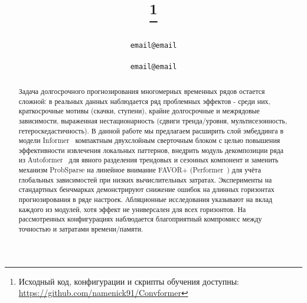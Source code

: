 \pagestyle{fancy}
\thispagestyle{empty}
\rhead{ \textit{ }} 


\title{
    \textbf{\paperName}
    \thanks{Исходный код, конфигурации и скрипты обучения доступны: \href{https://github.com/namenick91/Convformer}{https://github.com/namenick91/Convformer}} 
}

\author{
  \studentName \\
  \texttt{email@email} \\
    \And
  \teacherName \\
  \texttt{email@email} \\
}

\maketitle

\begin{abstract}
  Задача долгосрочного прогнозирования многомерных временных рядов остается 
  сложной: в реальных данных наблюдается ряд проблемных эффектов - среди них, 
  краткосрочные мотивы (скачки, ступени), 
  крайне долгосрочные и межрядовые зависимости, выраженная нестационарность 
  (сдвиги тренда/уровня, мультисезонность, гетероскедастичность).
  В данной работе мы предлагаем расширить слой эмбеддинга в модели 
  Informer~\cite{informer} компактным двухслойным сверточным блоком с целью 
  повышения эффективности извлечения локальных паттернов, внедрить модуль
  декомпозиции ряда из Autoformer~\cite{autoformer} для явного разделения 
  трендовых и сезонных компонент и заменить механизм ProbSparse на линейное внимание FAVOR+
  (Performer~\cite{performer}) для учёта глобальных зависимостей при низких 
  вычислительных затратах.
  Эксперименты на стандартных бенчмарках демонстрируют
  снижение ошибок на длинных горизонтах прогнозирования в ряде настроек.
  Абляционные исследования указывают на вклад каждого из модулей, 
  хотя эффект не универсален для всех горизонтов. 
  На рассмотренных конфигурациях наблюдается благоприятный компромисс между точностью 
  и затратами времени/памяти.
\end{abstract}

